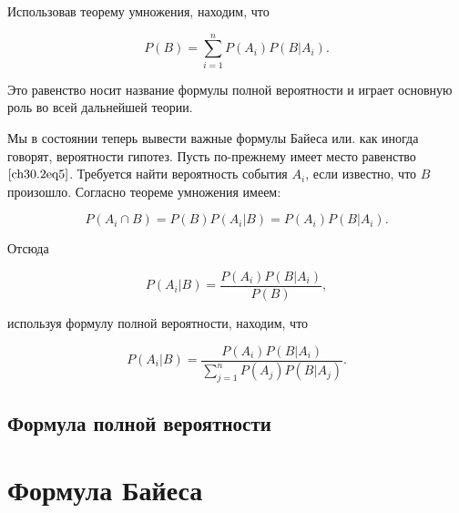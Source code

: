 Использовав теорему умножения, находим, что

$$
P(B) = \sum_{i = 1}^{n} P(A_i)P(B|A_i).
$$

Это равенство носит название формулы полной вероятности и играет основную роль во всей дальнейшей теории.

Мы в состоянии теперь вывести важные формулы Байеса или. как иногда говорят, вероятности гипотез. Пусть по-прежнему имеет место равенство $\eqref{ch30.2eq5}$. Требуется найти вероятность события $A_i$, если известно, что $B$ произошло. Согласно теореме умножения имеем:

$$
P(A_i\cap B) = P(B)P(A_i|B) = P(A_i)P(B|A_i).
$$

Отсюда

$$
P(A_i|B) = \frac{P(A_i)P(B|A_i)}{P(B)},
$$

используя формулу полной вероятности, находим, что

$$
P(A_i|B) = \frac{P(A_i)P(B|A_i)}{\sum\limits_{j = 1}^{n} P(A_j)P(B|A_j)}.
$$

\subsection{Формула полной вероятности}
\section{Формула Байеса}
